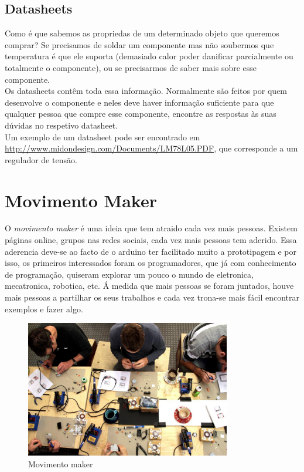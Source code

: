 \documentclass{article}
\begin{document}
\subsection{Datasheets}
Como é que sabemos as propriedas de um determinado objeto que queremos comprar? Se precisamos de soldar um componente mas não soubermos que temperatura é que ele suporta (demasiado calor poder danificar parcialmente ou totalmente o componente), ou se precisarmos de saber mais sobre esse componente.\newline \\
Os datasheets contêm toda essa informação. Normalmente são feitos por quem desenvolve o componente e neles deve haver informação suficiente para que qualquer pessoa que compre esse componente, encontre as respostas às suas dúvidas no respetivo datasheet.\newline \\
Um exemplo de um datasheet pode ser encontrado em \url{http://www.midondesign.com/Documents/LM78L05.PDF}, que corresponde a um regulador de tensão.

\section{Movimento Maker}
O \textit{movimento maker} é uma ideia que tem atraido cada vez mais pessoas. Existem páginas online, grupos nas redes sociais, cada vez mais pessoas tem aderido. Essa aderencia deve-se ao facto de o arduino ter facilitado muito a prototipagem e por isso, os primeiros interessados foram os programadores, que já com conhecimento de programação, quiseram explorar um pouco o mundo de eletronica, mecatronica, robotica, etc.\newline
Á medida que mais pessoas se foram juntados, houve mais pessoas a partilhar os seus trabalhos e cada vez trona-se mais fácil encontrar exemplos e fazer algo.

\begin{figure}[h]
\centering
\includegraphics[width=0.8\textwidth]{img/makers}
\caption{Movimento maker}
\end{figure}
\end{document}
